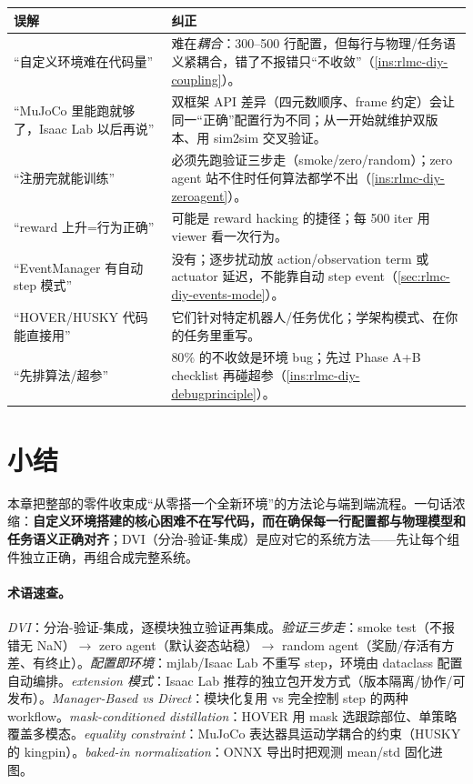 \begin{center}
\small
\begin{tabular}{@{}p{5.6cm}p{8.0cm}@{}}
\toprule
误解 & 纠正 \\
\midrule
“自定义环境难在代码量” & 难在\emph{耦合}：300--500 行配置，但每行与物理/任务语义紧耦合，错了不报错只“不收敛”（\cref{ins:rlmc-diy-coupling}）。 \\
“MuJoCo 里能跑就够了，Isaac Lab 以后再说” & 双框架 API 差异（四元数顺序、frame 约定）会让同一“正确”配置行为不同；从一开始就维护双版本、用 sim2sim 交叉验证。 \\
“注册完就能训练” & 必须先跑验证三步走（smoke/zero/random）；zero agent 站不住时任何算法都学不出（\cref{ins:rlmc-diy-zeroagent}）。 \\
“reward 上升=行为正确” & 可能是 reward hacking 的捷径；每 500 iter 用 viewer 看一次行为。 \\
“EventManager 有自动 step 模式” & 没有；逐步扰动放 action/observation term 或 actuator 延迟，不能靠自动 step event（\cref{sec:rlmc-diy-events-mode}）。 \\
“HOVER/HUSKY 代码能直接用” & 它们针对特定机器人/任务优化；学架构模式、在你的任务里重写。 \\
“先排算法/超参” & $80\%$ 的不收敛是环境 bug；先过 Phase A+B checklist 再碰超参（\cref{ins:rlmc-diy-debugprinciple}）。 \\
\bottomrule
\end{tabular}
\end{center}

\section{小结}
\label{sec:rlmc-diy-summary}

本章把整部的零件收束成“从零搭一个全新环境”的方法论与端到端流程。一句话浓缩：\textbf{自定义环境搭建的核心困难不在写代码，而在确保每一行配置都与物理模型和任务语义正确对齐}；DVI（分治-验证-集成）是应对它的系统方法——先让每个组件独立正确，再组合成完整系统。

\paragraph{术语速查。}\emph{DVI}：分治-验证-集成，逐模块独立验证再集成。\emph{验证三步走}：smoke test（不报错无 NaN）$\to$ zero agent（默认姿态站稳）$\to$ random agent（奖励/存活有方差、有终止）。\emph{配置即环境}：mjlab/Isaac Lab 不重写 step，环境由 dataclass 配置自动编排。\emph{extension 模式}：Isaac Lab 推荐的独立包开发方式（版本隔离/协作/可发布）。\emph{Manager-Based vs Direct}：模块化复用 vs 完全控制 step 的两种 workflow。\emph{mask-conditioned distillation}：HOVER 用 mask 选跟踪部位、单策略覆盖多模态。\emph{equality constraint}：MuJoCo 表达器具运动学耦合的约束（HUSKY 的 kingpin）。\emph{baked-in normalization}：ONNX 导出时把观测 mean/std 固化进图。

